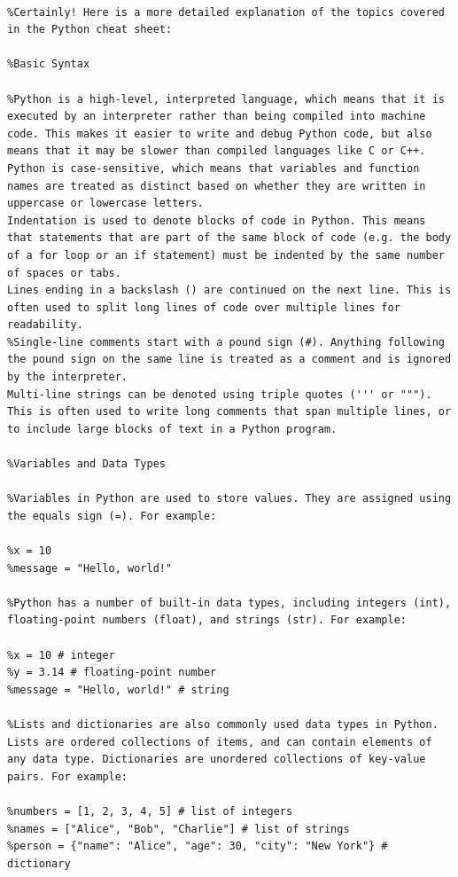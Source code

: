 \begin{lstlisting}[style=PythonStyle, label=lst:PythonCode]
	
%Certainly! Here is a more detailed explanation of the topics covered in the Python cheat sheet:

%Basic Syntax

%Python is a high-level, interpreted language, which means that it is executed by an interpreter rather than being compiled into machine code. This makes it easier to write and debug Python code, but also means that it may be slower than compiled languages like C or C++.
Python is case-sensitive, which means that variables and function names are treated as distinct based on whether they are written in uppercase or lowercase letters.
Indentation is used to denote blocks of code in Python. This means that statements that are part of the same block of code (e.g. the body of a for loop or an if statement) must be indented by the same number of spaces or tabs.
Lines ending in a backslash () are continued on the next line. This is often used to split long lines of code over multiple lines for readability.
%Single-line comments start with a pound sign (#). Anything following the pound sign on the same line is treated as a comment and is ignored by the interpreter.
Multi-line strings can be denoted using triple quotes (''' or """). This is often used to write long comments that span multiple lines, or to include large blocks of text in a Python program.

%Variables and Data Types

%Variables in Python are used to store values. They are assigned using the equals sign (=). For example:

%x = 10
%message = "Hello, world!"

%Python has a number of built-in data types, including integers (int), floating-point numbers (float), and strings (str). For example:

%x = 10 # integer
%y = 3.14 # floating-point number
%message = "Hello, world!" # string

%Lists and dictionaries are also commonly used data types in Python. Lists are ordered collections of items, and can contain elements of any data type. Dictionaries are unordered collections of key-value pairs. For example:

%numbers = [1, 2, 3, 4, 5] # list of integers
%names = ["Alice", "Bob", "Charlie"] # list of strings
%person = {"name": "Alice", "age": 30, "city": "New York"} # dictionary


\end{lstlisting}
